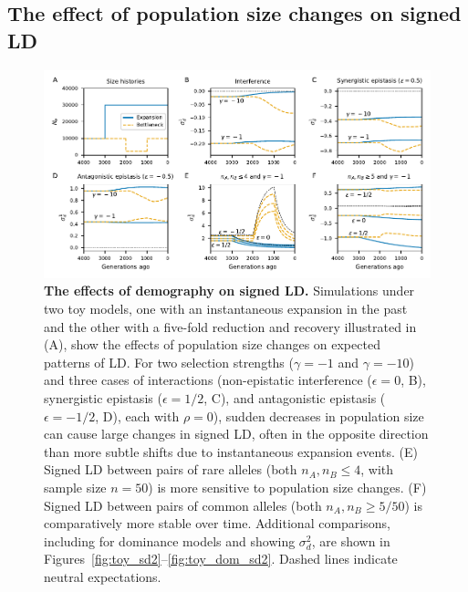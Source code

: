 \documentclass[]{article}
\begin{document}
\subsection{The effect of population size changes on signed LD}
\label{sec:demography}

\begin{figure}[tb!]
    \internallinenumbers
    \centering
    \includegraphics{../figures/demog_bottle_expand}
    \caption{
        \textbf{The effects of demography on signed LD.}
        Simulations under two toy models, one with an instantaneous expansion in
        the past and the other with a five-fold reduction and recovery illustrated
        in (A), show the effects of population size changes on expected patterns of LD. 
        For two selection strengths (\(\gamma=-1\) and \(\gamma=-10\)) and three
        cases of interactions (non-epistatic interference (\(\epsilon=0\), B),
        synergistic epistasis (\(\epsilon=1/2\), C), and antagonistic epistasis
        (\(\epsilon=-1/2\), D), each with \(\rho=0\)),
        sudden decreases in population size can cause
        large changes in signed LD, often in the opposite direction than more
        subtle shifts due to instantaneous expansion events.
        (E) Signed LD between pairs of rare alleles (both \(n_A, n_B \leq 4\), with
        sample size \(n=50\)) is more sensitive to population size changes.
        (F) Signed LD between pairs of common alleles (both \(n_A, n_B \geq 5/50\))
        is comparatively more stable over time.
        Additional comparisons, including for dominance models and showing
        \(\sigma_d^2\), are shown in Figures~\ref{fig:toy_sd2}--\ref{fig:toy_dom_sd2}.
        Dashed lines indicate neutral expectations.
    }
    \label{fig:toy}
\end{figure}
\end{document}
